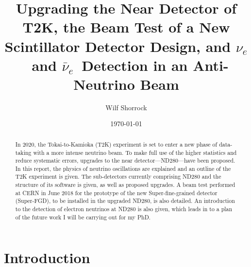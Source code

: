 \documentclass[aps,pra,12pt,notitlepage,tightenlines]{revtex4-1}
\newcommand{\nue}{$\nu_e$}
\newcommand{\anue}{$\bar\nu_e$}
\begin{document}
\title{Upgrading the Near Detector of T2K, the Beam Test of a New Scintillator Detector Design, and \nue \ and \anue \ Detection in an Anti-Neutrino Beam\vspace{0mm}}
\author{Wilf Shorrock\vspace{1mm}}
\date{\today}
\begin{abstract}
\linespread{0.97}
\vspace{1mm} In 2020, the Tokai-to-Kamioka (T2K) experiment is set to enter a new phase of data-taking with a more intense neutrino beam. To make full use of the higher statistics and reduce systematic errors, upgrades to the near detector---ND280---have been proposed. In this report, the physics of neutrino oscillations are explained and an outline of the T2K experiment is given. The sub-detectors currently comprising ND280 and the structure of its software is given, as well as proposed upgrades. A beam test performed at CERN in June 2018 for the prototype of the new Super-fine-grained detector (Super-FGD), to be installed in the upgraded ND280, is also detailed. An introduction to the detection of electron neutrinos at ND280 is also given, which leads in to a plan of the future work I will be carrying out for my PhD.
\end{abstract}

\maketitle

\newpage
\tableofcontents
\newpage

\vspace{-8mm}

\section{Introduction}
\end{document}
